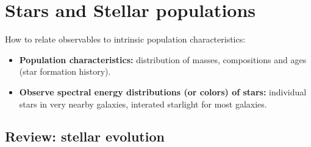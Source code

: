 \documentclass{article}
\begin{document}
\section{Stars and Stellar populations}
How to relate observables to intrinsic population characteristics:
\begin{itemize} %
    \item \textbf{Population characteristics:} distribution of masses, compositions
        and ages (star formation history).
    \item \textbf{Observe spectral energy distributions (or colors) of stars:}
        individual stars in very nearby galaxies, interated starlight
        for most galaxies.
\end{itemize}

\subsection{Review: stellar evolution}
\end{document}
